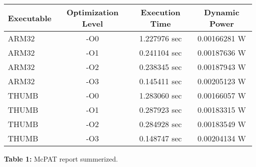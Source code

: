 \begin{tabular}{|l|c|c|c|}
\hline
Executable & Optimization Level & Execution Time & Dynamic Power \\
\hline
ARM32 & -O0 & 1.227976 sec & 0.00166281 W \\
ARM32 & -O1 & 0.241104 sec & 0.00187636 W \\
ARM32 & -O2 & 0.238345 sec & 0.00187943 W \\
ARM32 & -O3 & 0.145411 sec & 0.00205123 W \\
THUMB & -O0 & 1.283060 sec & 0.00166057 W \\
THUMB & -O1 & 0.287923 sec & 0.00183315 W \\
THUMB & -O2 & 0.284928 sec & 0.00183549 W \\
THUMB & -O3 & 0.148747 sec & 0.00204134 W \\
\hline
\end{tabular}

\textbf{Table 1:} McPAT report summerized.
